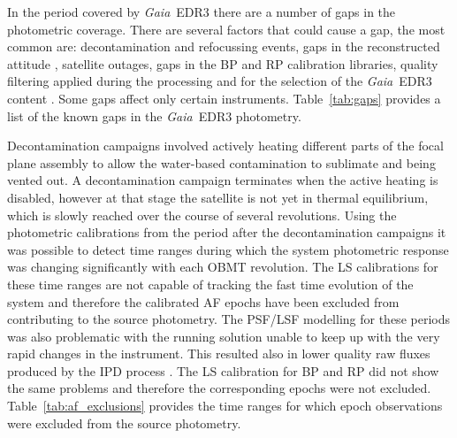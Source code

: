 \documentclass{aa}
\newcommand{\gaia}{\textit{Gaia}\xspace}
\newcommand{\edr}{\gaia~EDR3\xspace}
\newcommand{\xp}{BP and RP\xspace}
\newcommand{\tabref}[1]{Table~\ref{tab:#1}}
\begin{document}
\begin{appendix}
In the period covered by \edr there are a number of gaps in the photometric coverage. There are several factors that could cause a gap, the most common are: decontamination and refocussing events, gaps in the reconstructed attitude \citep[closely related to gaps in the crossmatch,][]{EDR3_XM}, satellite outages, gaps in the \xp calibration libraries, quality filtering applied during the processing and for the selection of the \edr content \citep{EDR3_CU9}. Some gaps affect only certain instruments. \tabref{gaps} provides a list of the known gaps in the \edr photometry.



Decontamination campaigns involved actively heating different parts of the focal plane assembly to allow the water-based contamination to sublimate and being vented out. A decontamination campaign terminates when the active heating is disabled, however at that stage the satellite is not yet in thermal equilibrium, which is slowly reached over the course of several revolutions. Using the photometric calibrations from the period after the decontamination campaigns it was possible to detect time ranges during which the system photometric response was changing significantly with each OBMT revolution. The LS calibrations for these time ranges are not capable of tracking the fast time evolution of the system and therefore the calibrated AF epochs have been excluded from contributing to the source photometry. The PSF/LSF modelling for these periods was also problematic with the running solution unable to keep up with the very rapid changes in the instrument. This resulted also in lower quality raw fluxes produced by the IPD process \citep[see Figure 10 in][]{EDR3_PSF}.
The LS calibration for BP and RP did not show the same problems and therefore the corresponding epochs were not excluded. \tabref{af_exclusions} provides the time ranges for which epoch observations were excluded from the source photometry.


\end{appendix}
\end{document}
